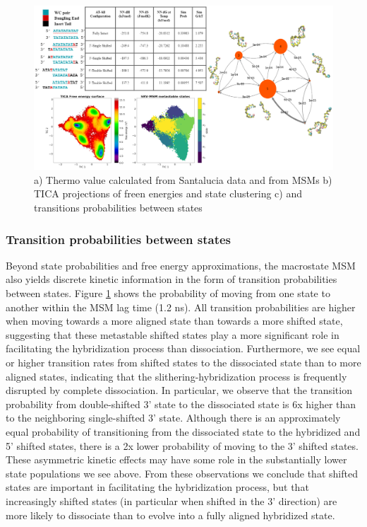 \documentclass[journal=jpcbfk,manuscript=article]{achemso}
\begin{document}
\begin{figure}[ht!]
	\begin{center}
        \includegraphics[width=\textwidth]{Figs/figs_0804/AT-all_in_one.PNG}
        \caption{a) Thermo value calculated from Santalucia data and from MSMs b) TICA projections of freen energies and state clustering c) and transitions probabilities between states}
        \label{fig:AT-all_in_one}
	\end{center}
\end{figure}

\subsubsection{\label{sec:Results}Transition probabilities between states}

Beyond state probabilities and free energy approximations, the macrostate MSM also yields discrete kinetic information in the form of transition probabilities between states. Figure \ref{fig:AT-all_in_one} shows the probability of moving from one state to another within the MSM lag time (1.2 ns). All transition probabilities are higher when moving towards a more aligned state than towards a more shifted state, suggesting that these metastable shifted states play a more significant role in facilitating the hybridization process than dissociation. Furthermore, we see equal or higher transition rates from shifted states to the dissociated state than to more aligned states, indicating that the slithering-hybridization process is frequently disrupted by complete dissociation. In particular, we observe that the transition probability from double-shifted 3' state to the dissociated state is 6x higher than to the neighboring single-shifted 3' state. Although there is an approximately equal probability of transitioning from the dissociated state to the hybridized and 5' shifted states, there is a 2x lower probability of moving to the 3' shifted states. These asymmetric kinetic effects may have some role in the substantially lower state populations we see above. From these observations we conclude that shifted states are important in facilitating the hybridization process, but that increasingly shifted states (in particular when shifted in the 3' direction) are more likely to dissociate than to evolve into a fully aligned hybridized state.
\end{document}
